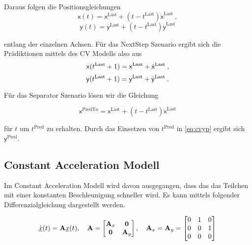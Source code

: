 Daraus folgen die Positionsgleichungen 
\begin{equation*}
    \mathsf{x}(t) = \mathsf{x}^{\text{Last}} + (t - t^{\text{Last}})\dot{\mathsf{x}}^{\text{Last}} \: ,
\end{equation*}
\begin{equation*}
    \mathsf{y}(t) = \mathsf{y}^{\text{Last}} + (t - t^{\text{Last}})\dot{\mathsf{y}}^{\text{Last}}
\end{equation*}

entlang der einzelnen Achsen.
Für das NextStep Szenario ergibt sich die Prädiktionen mittels des CV Modells also aus
\begin{equation*}
    \mathsf{x}(t{^{\text{Last}}}+1) = \mathsf{x}^{\text{Last}} + \dot{\mathsf{x}}^{\text{Last}} \: ,
\end{equation*}
\begin{equation}\label{eq:cvyp}
    \mathsf{y}(t{^{\text{Last}}}+1) = \mathsf{y}^{\text{Last}} + \dot{\mathsf{y}}^{\text{Last}} \: .
\end{equation}

Für das Separator Szenario lösen wir die Gleichung 

\begin{equation*}
    \mathsf{x}^{\text{PredTo}} = \mathsf{x}^{\text{Last}} + (t - t^{\text{Last}})\dot{\mathsf{x}}^{\text{Last}}
\end{equation*}

für \(t\) um  \(t^{\text{Pred}}\) zu erhalten.
Durch das Einsetzen von \(t^{\text{Pred}}\) in \eqref{eq:cvyp} ergibt sich \(\mathsf{y}^{\text{Pred}}\).

\subsection{Constant Acceleration Modell}

Im Constant Acceleration Modell wird davon ausgegangen, dass das das Teilchen mit einer konstanten Beschleunigung schneller wird.
Es kann mittels folgender Differenzialgleichung dargestellt werden.

\begin{align*} \label{eq:speedCV}
    \dot{{\underline{x}}}(t) = {{\mathbf{A}}}{\underline{x}}(t), \quad {\ensuremath{{\mathbf{A}}}} = 
    \begin{bmatrix}
        {\ensuremath{{\mathbf{A}}}}_x & \boldsymbol{0} \\
        \boldsymbol{0} & {{\mathbf{A}}}_y
    \end{bmatrix} 
    , \quad
    {\ensuremath{{\mathbf{A}}}}_x = {{\mathbf{A}}}_y = 
    \begin{bmatrix}
        0 & 1 & 0 \\
        0 & 0 & 1 \\
        0 & 0 & 0
    \end{bmatrix} 
\end{align*}

